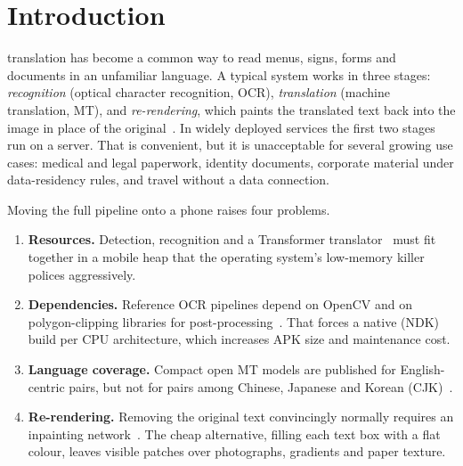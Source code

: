 \documentclass[journal]{IEEEtran}
\theoremstyle{definition}
\begin{document}
\section{Introduction}
 translation has become a common way to read
menus, signs, forms and documents in an unfamiliar language. A typical system
works in three stages: \emph{recognition} (optical character recognition,
OCR), \emph{translation} (machine translation, MT), and \emph{re-rendering},
which paints the translated text back into the image in place of the
original~\cite{mansimov2020inimage}. In widely deployed services the first two
stages run on a server. That is convenient, but it is unacceptable for several
growing use cases: medical and legal paperwork, identity documents, corporate
material under data-residency rules, and travel without a data connection.

Moving the full pipeline onto a phone raises four problems.
\begin{enumerate}
  \item \textbf{Resources.} Detection, recognition and a Transformer
  translator~\cite{vaswani2017attention} must fit together in a mobile heap
  that the operating system's low-memory killer polices aggressively.
  \item \textbf{Dependencies.} Reference OCR pipelines depend on OpenCV and on
  polygon-clipping libraries for post-processing~\cite{paddleocr}. That forces
  a native (NDK) build per CPU architecture, which increases APK size and
  maintenance cost.
  \item \textbf{Language coverage.} Compact open MT models are published for
  English-centric pairs, but not for pairs among Chinese, Japanese and Korean
  (CJK)~\cite{tiedemann2020opusmt}.
  \item \textbf{Re-rendering.} Removing the original text convincingly
  normally requires an inpainting network~\cite{suvorov2022lama,zhang2019ensnet}.
  The cheap alternative, filling each text box with a flat colour, leaves
  visible patches over photographs, gradients and paper texture.
\end{enumerate}
\end{document}
